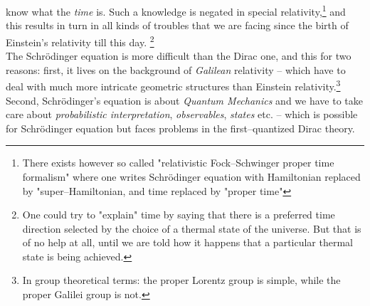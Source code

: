 \documentclass[12pt]{article}
\begin{document}
know what the {\sl time} is.  Such a knowledge is negated in special
relativity,\footnote{There exists however so called "relativistic
Fock--Schwinger proper time formalism" \cite[Ch. 2--5--4]{itz} where
one writes Schr\"odinger equation with Hamiltonian replaced by
"super--Hamiltonian,  and time replaced by "proper time"} and this results
in turn in all kinds of troubles that we are facing since the birth of
Einstein's relativity till this day.%
\footnote{One could try to "explain" time by saying that there is a
preferred time direction selected by
the choice of a thermal state of the universe. But that is of no help
at all, until
we are told how it happens that a particular thermal state is
being achieved.}
\\ The Schr\"odinger equation is more
difficult than the Dirac one,  and this for two reasons: 
first,  it lives on the
background of {\sl Galilean} relativity -- which have to deal with much more
intricate geometric structures than Einstein relativity.\footnote{
In group theoretical terms:  the proper Lorentz group is simple, 
while the proper Galilei group is not. } 
 Second, 
Schr\"odinger's equation is about {\sl Quantum Mechanics} and we have to take
care about {\sl probabilistic interpretation},  {\sl observables},  {\sl states
} etc.  -- which is possible for Schr\"odinger equation but faces
problems in the first--quantized Dirac theory.
\end{document}
